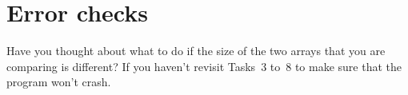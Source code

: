 \documentclass[english,a4paper,12pt,oneside]{article}
\begin{document}
\section{Error checks}

Have you thought about what to do if the size of the two arrays that you are comparing is different?
If you haven't revisit Tasks~3 to~8 to make sure that the program won't crash.




% 
% 
% 
% 
% 



% 
% 

\end{document}
